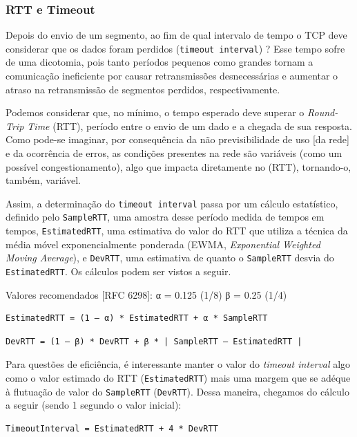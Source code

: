 \hypertarget{rtt-e-timeout}{%
\subsubsection{RTT e Timeout}\label{rtt-e-timeout}}

Depois do envio de um segmento, ao fim de qual intervalo de tempo o TCP
deve considerar que os dados foram perdidos (\texttt{timeout\ interval})
? Esse tempo sofre de uma dicotomia, pois tanto períodos pequenos como
grandes tornam a comunicação ineficiente por causar retransmissões
desnecessárias e aumentar o atraso na retransmissão de segmentos
perdidos, respectivamente.

Podemos considerar que, no mínimo, o tempo esperado deve superar o
\emph{Round-Trip Time} (RTT), período entre o envio de um dado e a
chegada de sua resposta. Como pode-se imaginar, por consequência da não
previsibilidade de uso {[}da rede{]} e da ocorrência de erros, as
condições presentes na rede são variáveis (como um possível
congestionamento), algo que impacta diretamente no (RTT), tornando-o,
também, variável.

Assim, a determinação do \texttt{timeout\ interval} passa por um cálculo
estatístico, definido pelo \texttt{SampleRTT}, uma amostra desse período
medida de tempos em tempos, \texttt{EstimatedRTT}, uma estimativa do
valor do RTT que utiliza a técnica da média móvel exponencialmente
ponderada (EWMA, \emph{Exponential Weighted Moving Average}), e
\texttt{DevRTT}, uma estimativa de quanto o \texttt{SampleRTT} desvia do
\texttt{EstimatedRTT}. Os cálculos podem ser vistos a seguir.

Valores recomendados {[}RFC 6298{]}: α = 0.125 (1/8) β = 0.25 (1/4)

\begin{verbatim}
EstimatedRTT = (1 – α) * EstimatedRTT + α * SampleRTT
\end{verbatim}

\begin{verbatim}
DevRTT = (1 – β) * DevRTT + β * | SampleRTT – EstimatedRTT |
\end{verbatim}

Para questões de eficiência, é interessante manter o valor do
\emph{timeout interval} algo como o valor estimado do RTT
(\texttt{EstimatedRTT}) mais uma margem que se adéque à flutuação de
valor do \texttt{SampleRTT} (\texttt{DevRTT}). Dessa maneira, chegamos
do cálculo a seguir (sendo 1 segundo o valor inicial):

\begin{verbatim}
TimeoutInterval = EstimatedRTT + 4 * DevRTT
\end{verbatim}

